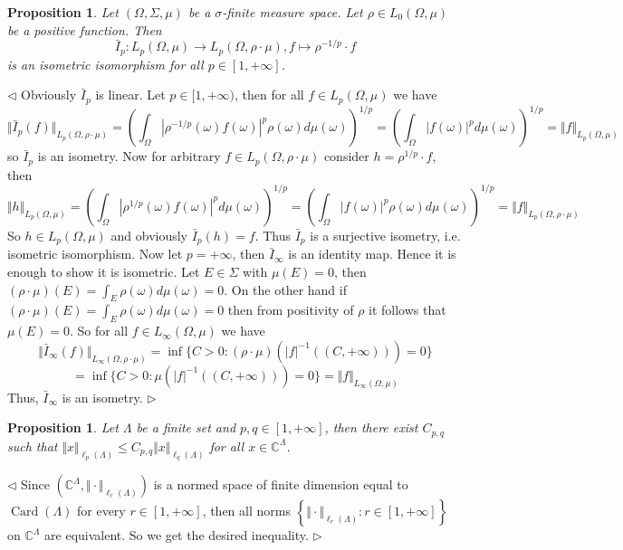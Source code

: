 \documentclass[12pt]{article}
\newtheorem{proposition}[theorem]{Proposition}
\newenvironment{proof}{\par $\triangleleft$}{$\triangleright$}
\begin{document}
\begin{proposition}\label{ChngOfDenst} Let $(\Omega,\Sigma,\mu)$ be a $\sigma$-finite measure space. Let $\rho\in L_0(\Omega,\mu)$ be a  positive function. Then
$$
\bar{I}_p:L_p(\Omega,\mu)\to L_p(\Omega,\rho\cdot \mu), f\mapsto\rho^{-1/p}\cdot f
$$
is an isometric isomorphism for all $p\in[1,+\infty]$.
\end{proposition}
\begin{proof} Obviously $\bar{I}_p$ is linear. Let $p\in[1,+\infty)$, then for all $f\in L_p(\Omega,\mu)$ we have
$$
\Vert \bar{I}_p(f)\Vert_{L_p(\Omega,\rho\cdot\mu)}
=\left(\int_{\Omega}|\rho^{-1/p}(\omega)f(\omega)|^p\rho(\omega)d\mu(\omega) \right)^{1/p}
=\left(\int_{\Omega}|f(\omega)|^pd\mu(\omega) \right)^{1/p}
=\Vert f\Vert_{L_p(\Omega,\mu)}
$$
so $\bar{I}_p$ is an isometry. Now for arbitrary $f\in L_p(\Omega,\rho\cdot\mu)$ consider $h=\rho^{1/p}\cdot f$, then
$$
\Vert h\Vert_{L_p(\Omega,\mu)}
=\left(\int_{\Omega}|\rho^{1/p}(\omega)f(\omega)|^pd\mu(\omega) \right)^{1/p}
=\left(\int_{\Omega}|f(\omega)|^p\rho(\omega)d\mu(\omega) \right)^{1/p}
=\Vert f\Vert_{L_p(\Omega,\rho\cdot\mu)}
$$
So $h\in L_p(\Omega,\mu)$ and obviously $\bar{I}_p(h)=f$. Thus $\bar{I}_p$
 is a surjective isometry, i.e.  isometric isomorphism. Now let $p=+\infty$, then $\bar{I}_\infty$ is an identity map. Hence it is enough to show it is isometric. Let $E\in\Sigma$ with $\mu(E)=0$, then $(\rho\cdot\mu)(E)=\int_E\rho(\omega)d\mu(\omega)=0$. On the other hand if $(\rho\cdot\mu)(E)=\int_E\rho(\omega)d\mu(\omega)=0$ then from positivity of $\rho$ it follows that $\mu(E)=0$. So for all $f\in L_\infty(\Omega,\mu)$ we have
$$
\Vert\bar{I}_\infty(f)\Vert_{L_\infty(\Omega,\rho\cdot\mu)}
=\inf\{C>0:(\rho\cdot\mu)(|f|^{-1}((C,+\infty)))=0\}
$$
$$
=\inf\{C>0:\mu(|f|^{-1}((C,+\infty)))=0\}
=\Vert f\Vert_{L_\infty(\Omega,\mu)}
$$
Thus, $\bar{I}_\infty$ is an isometry.
\end{proof}

\begin{proposition}\label{FinDimlpEquivNorms} Let $\Lambda$ be a finite set and $p,q\in[1,+\infty]$, then there exist $C_{p,q}$ such that $\Vert x\Vert_{\ell_p(\Lambda)}\leq C_{p,q}\Vert x\Vert_{\ell_q(\Lambda)}$ for all $x\in\mathbb{C}^\Lambda$.
\end{proposition}
\begin{proof} Since $(\mathbb{C}^\Lambda,\Vert\cdot\Vert_{\ell_r(\Lambda)})$ is a normed space of finite dimension equal to $\operatorname{Card}(\Lambda)$ for every $r\in[1,+\infty]$, then all norms $\left\{\Vert\cdot\Vert_{\ell_r(\Lambda)}:r\in[1,+\infty]\right\}$ on $\mathbb{C}^\Lambda$ are equivalent. So we get the desired inequality.
\end{proof}
\end{document}
